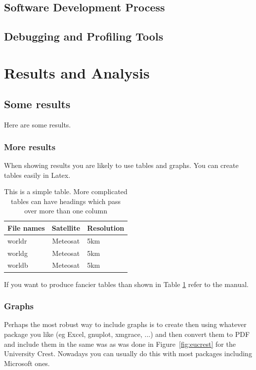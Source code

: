 \documentclass[12pt,a4paper]{article}
\begin{document}
\subsection{Software Development Process}

\subsection{Debugging and Profiling Tools}

\newpage
\section{Results and Analysis}

\subsection{Some results}
Here are some results.

\subsubsection{More results}
When showing results you are likely to use tables and graphs. You can
create tables easily in Latex.

\begin{table}[h]
\begin{center}
\begin{tabular}{||l|c|l||}
\hline
{\bf File names} & {\bf Satellite} & {\bf Resolution}\\
\hline
  worldr         &  Meteosat     &   5km\\
  worldg         &  Meteosat     &   5km\\
  worldb         &  Meteosat     &   5km\\
\hline
\end{tabular}
\end{center}
\caption{This is a simple table. More complicated tables can have
headings which pass over more than one column}
\label{simple_table}
\end{table}

If you want to produce fancier tables than shown in Table \ref{simple_table}
refer to the manual.

\subsubsection{Graphs}

Perhaps the most robust way to include graphs is to create then using
whatever package you like (eg Excel, gnuplot, xmgrace, ...) and then
convert them to PDF and include them in the same was as was done in
Figure~\ref{fig:eucrest} for the University Crest. Nowadays you can
usually do this with most packages including Microsoft ones.
\end{document}

